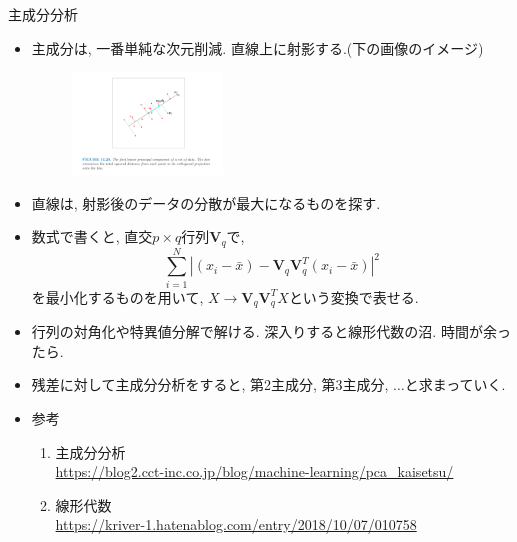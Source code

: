 \documentclass[dvipdfmx,8pt]{beamer}
\begin{document}
  \begin{frame}{主成分分析}
    \begin{itemize}
      \item 主成分は, 一番単純な次元削減. 直線上に射影する.(下の画像のイメージ)\\
        \begin{figure}[htb]
          \centering
          \includegraphics[width=4cm,clip]{images/pca.png}
        \end{figure}
      \item 直線は, 射影後のデータの分散が最大になるものを探す.
      \item 数式で書くと, 直交$p\times q$行列$\textbf{V}_q$で,
        \[
          \sum_{i=1}^N|(x_i-\bar{x})-\textbf{V}_q\textbf{V}_q^T(x_i-\bar{x})|^2
        \]
        を最小化するものを用いて, $X \to \textbf{V}_q\textbf{V}_q^TX$という変換で表せる.
      \item 行列の対角化や特異値分解で解ける. 深入りすると線形代数の沼. 時間が余ったら.
      \item 残差に対して主成分分析をすると, 第2主成分, 第3主成分, $\dots$と求まっていく.
      \item 参考\\
        \begin{enumerate}
          \item 主成分分析\\
            \url{https://blog2.cct-inc.co.jp/blog/machine-learning/pca_kaisetsu/}\\
          \item 線形代数\\
            \url{https://kriver-1.hatenablog.com/entry/2018/10/07/010758}
        \end{enumerate}
    \end{itemize}
  \end{frame}
\end{document}
